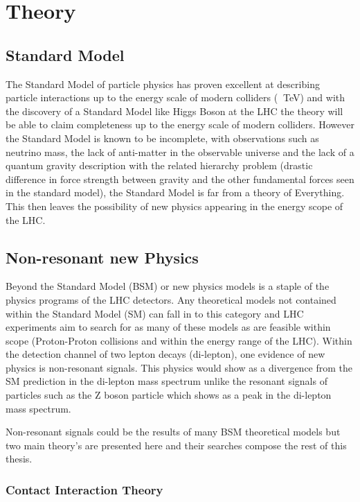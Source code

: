 \chapter{Theory}


\section{Standard Model}
    
    The Standard Model of particle physics has proven excellent at describing particle interactions up to the energy scale of modern colliders ($~$ TeV) and with the discovery of a Standard Model like Higgs Boson at the LHC the theory will be able to claim completeness up to the energy scale of modern colliders. However the Standard Model is known to be incomplete, with observations such as neutrino mass, the lack of anti-matter in the observable universe and the lack of a quantum gravity description with the related hierarchy problem (drastic difference in force strength between gravity and the other fundamental forces seen in the standard model),  the Standard Model is far from a theory of Everything. This then leaves the possibility of new physics appearing in the energy scope of the LHC.



\section{Non-resonant new Physics}

    Beyond the Standard Model (BSM) or new physics models is a staple of the physics programs of the LHC detectors. Any theoretical models not contained within the Standard Model (SM) can fall in to this category and LHC experiments aim to search for as many of these models as are feasible within scope (Proton-Proton collisions and within the energy range of the LHC). Within the detection channel of two lepton decays (di-lepton), one evidence of new physics is non-resonant signals. This physics would show as a divergence from the SM prediction in the di-lepton mass spectrum unlike the resonant signals of particles such as the Z boson particle which shows as a peak in the di-lepton mass spectrum.

    Non-resonant signals could be the results of many BSM theoretical models but two main theory’s are presented here and their searches compose the rest of this thesis.


    \subsection{Contact Interaction Theory}

